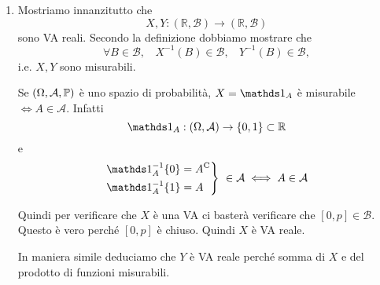 \ParteSoluzioni

\Soluzione

\begin{enumerate}
\item Mostriamo innanzitutto che
\begin{equation*}
X,Y:(\mathbb{R} ,\mathcal{B})\rightarrow (\mathbb{R} ,\mathcal{B})
\end{equation*}
sono VA reali. Secondo la definizione dobbiamo mostrare che
\begin{equation*}
\forall B\in \mathcal{B} ,\ \ \ \ X^{-1}(B) \in \mathcal{B} ,\ \ \ \ Y^{-1}(B) \in \mathcal{B} ,
\end{equation*}
i.e. $X,Y$ sono misurabili.
\begin{oss}
Se $(\Omega ,\mathcal{A} ,\mathbb{P})$ è uno spazio di probabilità, $X=\Ind_{A}$ è misurabile $\iff A\in \mathcal{A}$. Infatti
\begin{equation*}
\Ind_{A} :(\Omega ,\mathcal{A})\rightarrow \{0,1\} \subset \mathbb{R}
\end{equation*}
e
\begin{equation*}
\begin{drcases}
\Ind_{A}^{-1}\{0\} =A\comp\\
\Ind_{A}^{-1}\{1\} =A
\end{drcases}
\ \in \mathcal{A} \iff A\in \mathcal{A}
\end{equation*}
\end{oss}

Quindi per verificare che $X$ è una VA ci basterà verificare che $[0,p] \in \mathcal{B}$. Questo è vero perché $[0,p]$ è chiuso. Quindi $X$ è VA reale.

In maniera simile deduciamo che $Y$ è VA reale perché somma di $X$ e del prodotto di funzioni misurabili.


\end{enumerate}
